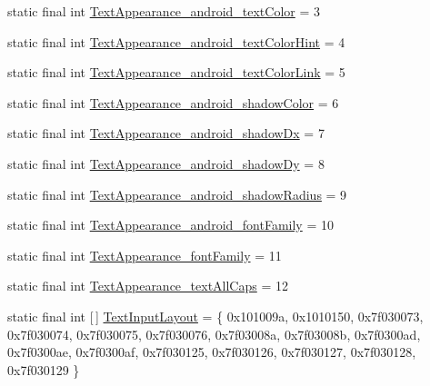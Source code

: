 \begin{DoxyCompactItemize}
\item 
static final int \mbox{\hyperlink{classandroid_1_1support_1_1design_1_1_r_1_1styleable_a129155598b9f1854731c9f078ece488f}{Text\+Appearance\+\_\+android\+\_\+text\+Color}} = 3
\item 
static final int \mbox{\hyperlink{classandroid_1_1support_1_1design_1_1_r_1_1styleable_a7bbcec77aa5ef2ece2ad0d9e504296f3}{Text\+Appearance\+\_\+android\+\_\+text\+Color\+Hint}} = 4
\item 
static final int \mbox{\hyperlink{classandroid_1_1support_1_1design_1_1_r_1_1styleable_aff2b855100a28f0ce04d9ac2cb1b812b}{Text\+Appearance\+\_\+android\+\_\+text\+Color\+Link}} = 5
\item 
static final int \mbox{\hyperlink{classandroid_1_1support_1_1design_1_1_r_1_1styleable_a6f271140407acd9fe3f06b8fba7c107e}{Text\+Appearance\+\_\+android\+\_\+shadow\+Color}} = 6
\item 
static final int \mbox{\hyperlink{classandroid_1_1support_1_1design_1_1_r_1_1styleable_a5e7de3b733daea5868861df0dfa76062}{Text\+Appearance\+\_\+android\+\_\+shadow\+Dx}} = 7
\item 
static final int \mbox{\hyperlink{classandroid_1_1support_1_1design_1_1_r_1_1styleable_a4f96e3e9d52b106bfa676c09e87a73c8}{Text\+Appearance\+\_\+android\+\_\+shadow\+Dy}} = 8
\item 
static final int \mbox{\hyperlink{classandroid_1_1support_1_1design_1_1_r_1_1styleable_a57fc574506aa93a9939345f27539bd48}{Text\+Appearance\+\_\+android\+\_\+shadow\+Radius}} = 9
\item 
static final int \mbox{\hyperlink{classandroid_1_1support_1_1design_1_1_r_1_1styleable_a36e48b043501f3b5f0ba382b6bf750e5}{Text\+Appearance\+\_\+android\+\_\+font\+Family}} = 10
\item 
static final int \mbox{\hyperlink{classandroid_1_1support_1_1design_1_1_r_1_1styleable_af3005c42b0e4178151f3fac95c8617e1}{Text\+Appearance\+\_\+font\+Family}} = 11
\item 
static final int \mbox{\hyperlink{classandroid_1_1support_1_1design_1_1_r_1_1styleable_a9222a2b9d5bbe0564ce516e6b451f89c}{Text\+Appearance\+\_\+text\+All\+Caps}} = 12
\item 
static final int \mbox{[}$\,$\mbox{]} \mbox{\hyperlink{classandroid_1_1support_1_1design_1_1_r_1_1styleable_ae01fd2fce65dc8639f3898586b0cedcf}{Text\+Input\+Layout}} = \{ 0x101009a, 0x1010150, 0x7f030073, 0x7f030074, 0x7f030075, 0x7f030076, 0x7f03008a, 0x7f03008b, 0x7f0300ad, 0x7f0300ae, 0x7f0300af, 0x7f030125, 0x7f030126, 0x7f030127, 0x7f030128, 0x7f030129 \}

\end{DoxyCompactItemize}
